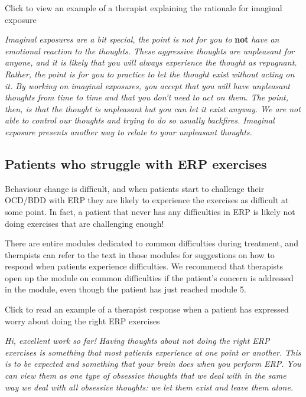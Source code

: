\documentclass[]{book}
\theoremstyle{definition}
\theoremstyle{definition}
\theoremstyle{definition}
\theoremstyle{remark}
\begin{document}
 Click to view an example of a therapist explaining the rationale for
imaginal exposure

\emph{Imaginal exposures are a bit special, the point is not for you to}
\textbf{not} \emph{have an emotional reaction to the thoughts. These
aggressive thoughts are unpleasant for anyone, and it is likely that you
will always experience the thought as repugnant. Rather, the point is
for you to practice to let the thought exist without acting on it. By
working on imaginal exposures, you accept that you will have unpleasant
thoughts from time to time and that you don't need to act on them. The
point, then, is that the thought is unpleasant but you can let it exist
anyway. We are not able to control our thoughts and trying to do so
usually backfires. Imaginal exposure presents another way to relate to
your unpleasant thoughts.}

\hypertarget{patients-who-struggle-with-erp-exercises}{%
\subsection{Patients who struggle with ERP
exercises}\label{patients-who-struggle-with-erp-exercises}}

Behaviour change is difficult, and when patients start to challenge
their OCD/BDD with ERP they are likely to experience the exercises as
difficult at some point. In fact, a patient that never has any
difficulties in ERP is likely not doing exercises that are challenging
enough!

There are entire modules dedicated to common difficulties during
treatment, and therapists can refer to the text in those modules for
suggestions on how to respond when patients experience difficulties. We
recommend that therapists open up the module on common difficulties if
the patient's concern is addressed in the module, even though the
patient has just reached module 5.

 Click to read an example of a therapist response when a patient has
expressed worry about doing the right ERP exercises

\emph{Hi, excellent work so far! Having thoughts about not doing the
right ERP exercises is something that most patients experience at one
point or another. This is to be expected and something that your brain
does when you perform ERP. You can view them as one type of obsessive
thoughts that we deal with in the same way we deal with all obsessive
thoughts: we let them exist and leave them alone.}
\end{document}
